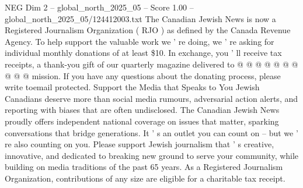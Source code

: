 \begin{textsample}{NEG Dim 2 – global\_north\_2025\_05 – Score 1.00 – global\_north\_2025\_05/124412003.txt}
The Canadian Jewish News is now a Registered Journalism Organization ( RJO ) as defined by the Canada Revenue Agency.
To help support the valuable work we ' re doing, we ' re asking for individual monthly donations of at least \$10.
In exchange, you ' ll receive tax receipts, a thank-you gift of our quarterly magazine delivered to @ @ @ @ @ @ @ @ @ @ mission.
If you have any questions about the donating process, please write toemail protected.
Support the Media that Speaks to You Jewish Canadians deserve more than social media rumours, adversarial action alerts, and reporting with biases that are often undisclosed.
The Canadian Jewish News proudly offers independent national coverage on issues that matter, sparking conversations that bridge generations.
It ' s an outlet you can count on -- but we ' re also counting on you.
Please support Jewish journalism that ' s creative, innovative, and dedicated to breaking new ground to serve your community, while building on media traditions of the past 65 years.
As a Registered Journalism Organization, contributions of any size are eligible for a charitable tax receipt.

\end{textsample}
